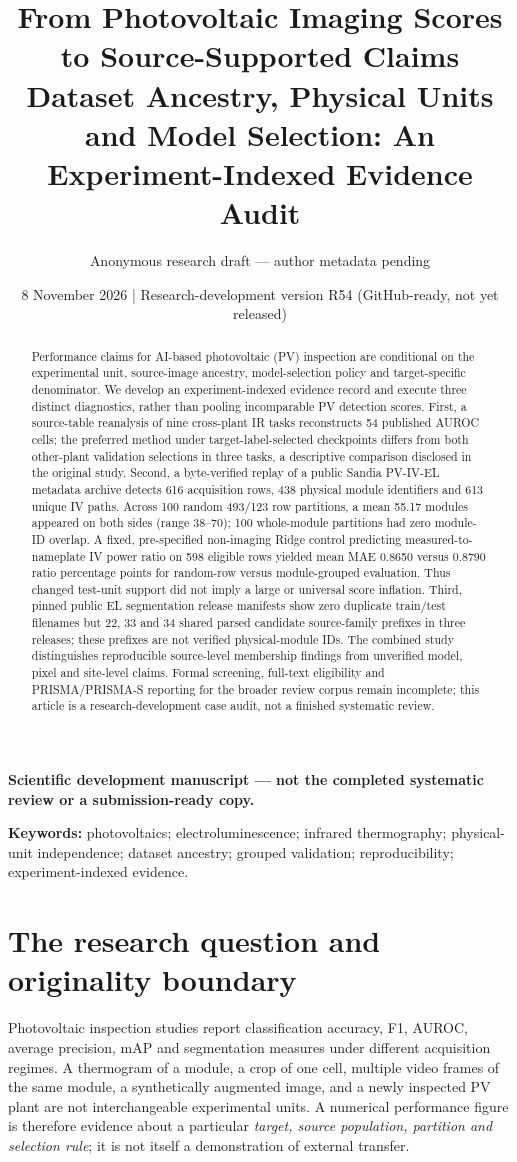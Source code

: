 \documentclass[10pt,a4paper]{article}
\title{From Photovoltaic Imaging Scores to Source-Supported Claims\\
\large Dataset Ancestry, Physical Units and Model Selection: An Experiment-Indexed Evidence Audit}
\author{Anonymous research draft --- author metadata pending}
\date{8 November 2026 \;|\; Research-development version R54 (GitHub-ready, not yet released)}
\newcommand{\papertype}{\textbf{Scientific development manuscript --- not the completed systematic review or a submission-ready copy.}}
\begin{document}
\maketitle
\begin{center}\small\papertype\end{center}
\begin{abstract}
Performance claims for AI-based photovoltaic (PV) inspection are conditional on the experimental unit, source-image ancestry, model-selection policy and target-specific denominator. We develop an experiment-indexed evidence record and execute three distinct diagnostics, rather than pooling incomparable PV detection scores. First, a source-table reanalysis of nine cross-plant IR tasks reconstructs 54 published AUROC cells; the preferred method under target-label-selected checkpoints differs from both other-plant validation selections in three tasks, a descriptive comparison disclosed in the original study. Second, a byte-verified replay of a public Sandia PV-IV-EL metadata archive detects 616 acquisition rows, 438 physical module identifiers and 613 unique IV paths. Across 100 random 493/123 row partitions, a mean 55.17 modules appeared on both sides (range 38--70); 100 whole-module partitions had zero module-ID overlap. A fixed, pre-specified non-imaging Ridge control predicting measured-to-nameplate IV power ratio on 598 eligible rows yielded mean MAE 0.8650 versus 0.8790 ratio percentage points for random-row versus module-grouped evaluation. Thus changed test-unit support did not imply a large or universal score inflation. Third, pinned public EL segmentation release manifests show zero duplicate train/test filenames but 22, 33 and 34 shared parsed candidate source-family prefixes in three releases; these prefixes are not verified physical-module IDs. The combined study distinguishes reproducible source-level membership findings from unverified model, pixel and site-level claims. Formal screening, full-text eligibility and PRISMA/PRISMA-S reporting for the broader review corpus remain incomplete; this article is a research-development case audit, not a finished systematic review.
\end{abstract}
\noindent\textbf{Keywords:} photovoltaics; electroluminescence; infrared thermography; physical-unit independence; dataset ancestry; grouped validation; reproducibility; experiment-indexed evidence.

\section{The research question and originality boundary}
Photovoltaic inspection studies report classification accuracy, F1, AUROC, average precision, mAP and segmentation measures under different acquisition regimes. A thermogram of a module, a crop of one cell, multiple video frames of the same module, a synthetically augmented image, and a newly inspected PV plant are not interchangeable experimental units. A numerical performance figure is therefore evidence about a particular \emph{target, source population, partition and selection rule}; it is not itself a demonstration of external transfer.
\end{document}
